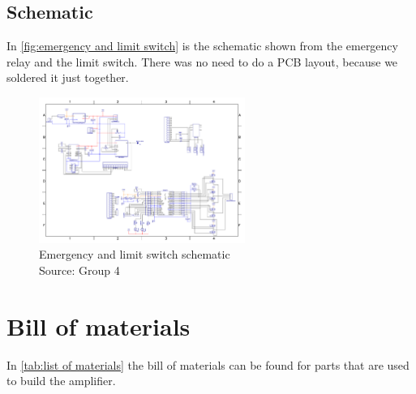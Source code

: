 \documentclass[a4paper,12pt]{scrreprt}
\begin{document}
\subsection{Schematic}
In \autoref{fig:emergency and limit switch} is the schematic shown from the emergency relay and the limit switch. There was no need to do a PCB layout, because we soldered it just together.
\begin{figure}[H]
  \centering
   \includegraphics[width=0.6\textwidth]{pictures/scematic_switch_emergency.pdf}
   \caption[Emergency and limit switch schematic]{Emergency and limit switch schematic\\
	Source: Group 4  
  }
   \label{fig:emergency and limit switch}
\end{figure}

\section{Bill of materials}
In \autoref{tab:list of materials} the bill of materials can be found for parts that are used to build the amplifier.
\end{document}
